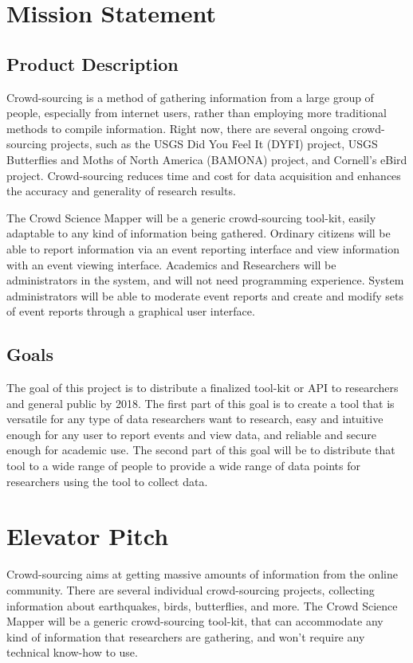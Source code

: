 
\section{Mission Statement}
\subsection{Product Description}

Crowd-sourcing is a method of gathering information from a large group of people, especially from internet users, rather than employing more traditional methods to compile information. Right now, there are several ongoing crowd-sourcing projects, such as the USGS Did You Feel It (DYFI) project, USGS Butterflies and Moths of North America (BAMONA) project, and Cornell’s eBird project. Crowd-sourcing reduces time and cost for data acquisition and enhances the accuracy and generality of research results.

The Crowd Science Mapper will be a generic crowd-sourcing tool-kit, easily adaptable to any kind of information being gathered. Ordinary citizens will be able to report information via an event reporting interface and view information with an event viewing interface. Academics and Researchers will be administrators in the system, and will not need programming experience. System administrators will be able to moderate event reports and create and modify sets of event reports through a graphical user interface. 

\subsection{Goals}
The goal of this project is to distribute a finalized tool-kit or API to researchers and general public by 2018. The first part of this goal is to create a tool that is versatile for any type of data researchers want to research, easy and intuitive enough for any user to report events and view data, and reliable and secure enough for academic use. The second part of this goal will be to distribute that tool to a wide range of people to provide a wide range of data points for researchers using the tool to collect data. 

\section{Elevator Pitch}
Crowd-sourcing aims at getting massive amounts of information from the online community. There are several individual crowd-sourcing projects, collecting information about earthquakes, birds, butterflies, and more. The Crowd Science Mapper will be a generic crowd-sourcing tool-kit, that can accommodate any kind of information that researchers are gathering, and won't require any technical know-how to use. 